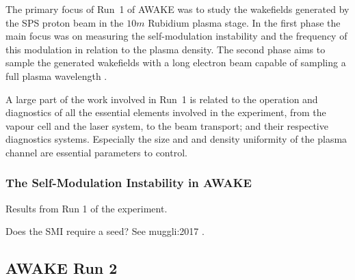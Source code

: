 The primary focus of Run~1 of AWAKE was to study the wakefields generated by the SPS proton beam in the $10\unit{m}$ Rubidium plasma stage.
In the first phase the main focus was on measuring the self-modulation instability and the frequency of this modulation in relation to the plasma density.
The second phase aims to sample the generated wakefields with a long electron beam capable of sampling a full plasma wavelength \cite{adli:2016a}.

A large part of the work involved in Run~1 is related to the operation and diagnostics of all the essential elements involved in the experiment, from the vapour cell and the laser system, to the beam transport; and their respective diagnostics systems.
Especially the size and and density uniformity of the plasma channel are essential parameters to control.

\subsubsection{The Self-Modulation Instability in AWAKE}
\label{WFA:SMI}

Results from Run 1 of the experiment.


Does the SMI require a seed? See muggli:2017 \cite{muggli:2017a}.

\subsection{AWAKE Run 2}
\label{WFA:AWAKE:R2}




